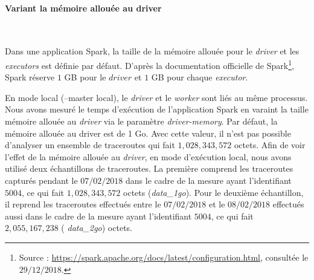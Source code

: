 \paragraph{Variant la mémoire allouée au driver}~

Dans une application Spark, la taille de la mémoire allouée pour le \textit{driver} et les \textit{executors} est  définie par défaut. D'après la documentation officielle de Spark\footnote{Source : \url{https://spark.apache.org/docs/latest/configuration.html}, consultée le $29/12/2018$.}, Spark réserve $ 1 $ GB pour le $ driver $ et $ 1 $ GB pour chaque \textit{executor}. 

En mode local (--master local), le \textit{driver} et le \textit{worker} sont liés au même processus.  Nous avons mesuré le temps d'exécution de l'application Spark en varaint la taille mémoire allouée au \textit{driver} via le paramètre \textit{driver-memory}. Par défaut, la mémoire allouée au driver est de 1 Go. Avec cette valeur, il n'est pas possible  d'analyser un ensemble de traceroutes qui fait $ 1,028,343,572 $ octets. Afin de voir l'effet de la mémoire allouée au \textit{driver}, en mode d'exécution local, nous avons utilisé deux échantillons de traceroutes. La première comprend les traceroutes capturés pendant le $ 07/02/2018 $ dans le cadre de la mesure ayant l'identifiant $ 5004 $, ce qui fait $ 1,028,343,572 $ octets (\textit{data\_1go}). Pour le deuxième échantillon, il reprend les traceroutes effectués  entre le $ 07/02/2018 $ et le $ 08/02/2018 $ effectués aussi dans le cadre de la mesure ayant l'identifiant $ 5004 $, ce qui fait $ 2,055,167,238 $ (\textit{ data\_2go}) octets.

